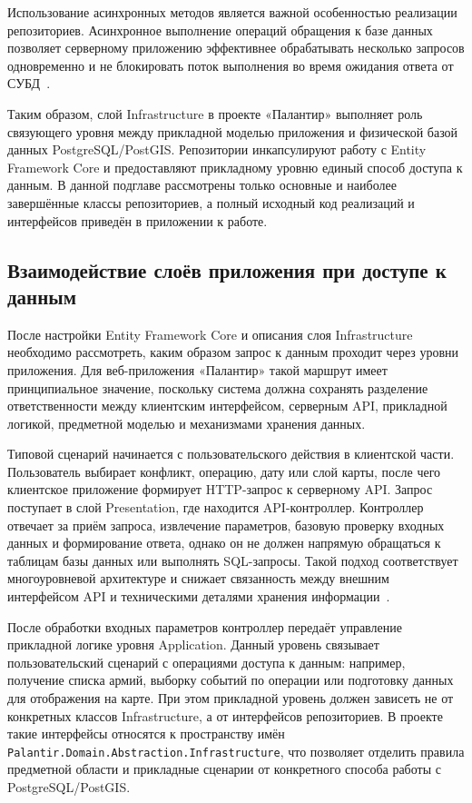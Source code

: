 Использование асинхронных методов является важной особенностью реализации репозиториев. Асинхронное выполнение операций обращения к базе данных позволяет серверному приложению эффективнее обрабатывать несколько запросов одновременно и не блокировать поток выполнения во время ожидания ответа от СУБД~\cite{csharp_docs}.

Таким образом, слой Infrastructure в проекте «Палантир» выполняет роль связующего уровня между прикладной моделью приложения и физической базой данных PostgreSQL/PostGIS. Репозитории инкапсулируют работу с Entity Framework Core и предоставляют прикладному уровню единый способ доступа к данным. В данной подглаве рассмотрены только основные и наиболее завершённые классы репозиториев, а полный исходный код реализаций и интерфейсов приведён в приложении к работе.


\subsection{Взаимодействие слоёв приложения при доступе к данным}

После настройки Entity Framework Core и описания слоя Infrastructure необходимо рассмотреть, каким образом запрос к данным проходит через уровни приложения. Для веб-приложения «Палантир» такой маршрут имеет принципиальное значение, поскольку система должна сохранять разделение ответственности между клиентским интерфейсом, серверным API, прикладной логикой, предметной моделью и механизмами хранения данных.

Типовой сценарий начинается с пользовательского действия в клиентской части. Пользователь выбирает конфликт, операцию, дату или слой карты, после чего клиентское приложение формирует HTTP-запрос к серверному API. Запрос поступает в слой Presentation, где находится API-контроллер. Контроллер отвечает за приём запроса, извлечение параметров, базовую проверку входных данных и формирование ответа, однако он не должен напрямую обращаться к таблицам базы данных или выполнять SQL-запросы. Такой подход соответствует многоуровневой архитектуре и снижает связанность между внешним интерфейсом API и техническими деталями хранения информации~\cite{lock_aspnet_core_in_action}.

После обработки входных параметров контроллер передаёт управление прикладной логике уровня Application. Данный уровень связывает пользовательский сценарий с операциями доступа к данным: например, получение списка армий, выборку событий по операции или подготовку данных для отображения на карте. При этом прикладной уровень должен зависеть не от конкретных классов Infrastructure, а от интерфейсов репозиториев. В проекте такие интерфейсы относятся к пространству имён \texttt{Palantir.Domain.Abstraction.Infrastructure}, что позволяет отделить правила предметной области и прикладные сценарии от конкретного способа работы с PostgreSQL/PostGIS.

